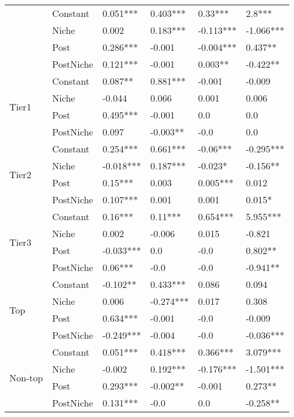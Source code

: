 \begin{longtable}[h!]{llllll}
\bottomrule
\endlastfoot
\multirow{4}{*}{Full} & Constant &            0.051*** &    0.403*** &    0.33*** &     2.8*** \\
        & Niche &               0.002 &    0.183*** &  -0.113*** &  -1.066*** \\
        & Post &            0.286*** &      -0.001 &  -0.004*** &    0.437** \\
        & PostNiche &            0.121*** &      -0.001 &    0.003** &   -0.422** \\
\cline{1-6}
\multirow{4}{*}{Tier1} & Constant &             0.087** &    0.881*** &     -0.001 &     -0.009 \\
        & Niche &              -0.044 &       0.066 &      0.001 &      0.006 \\
        & Post &            0.495*** &      -0.001 &        0.0 &        0.0 \\
        & PostNiche &               0.097 &    -0.003** &       -0.0 &        0.0 \\
\cline{1-6}
\multirow{4}{*}{Tier2} & Constant &            0.254*** &    0.661*** &   -0.06*** &  -0.295*** \\
        & Niche &           -0.018*** &    0.187*** &    -0.023* &   -0.156** \\
        & Post &             0.15*** &       0.003 &   0.005*** &      0.012 \\
        & PostNiche &            0.107*** &       0.001 &      0.001 &     0.015* \\
\cline{1-6}
\multirow{4}{*}{Tier3} & Constant &             0.16*** &     0.11*** &   0.654*** &   5.955*** \\
        & Niche &               0.002 &      -0.006 &      0.015 &     -0.821 \\
        & Post &           -0.033*** &         0.0 &       -0.0 &    0.802** \\
        & PostNiche &             0.06*** &        -0.0 &       -0.0 &   -0.941** \\
\cline{1-6}
\multirow{4}{*}{Top} & Constant &            -0.102** &    0.433*** &      0.086 &      0.094 \\
        & Niche &               0.006 &   -0.274*** &      0.017 &      0.308 \\
        & Post &            0.634*** &      -0.001 &       -0.0 &     -0.009 \\
        & PostNiche &           -0.249*** &      -0.004 &       -0.0 &  -0.036*** \\
\cline{1-6}
\multirow{4}{*}{Non-top} & Constant &            0.051*** &    0.418*** &   0.366*** &   3.079*** \\
        & Niche &              -0.002 &    0.192*** &  -0.176*** &  -1.501*** \\
        & Post &            0.293*** &    -0.002** &     -0.001 &    0.273** \\
        & PostNiche &            0.131*** &        -0.0 &        0.0 &   -0.258** \\
\end{longtable}
